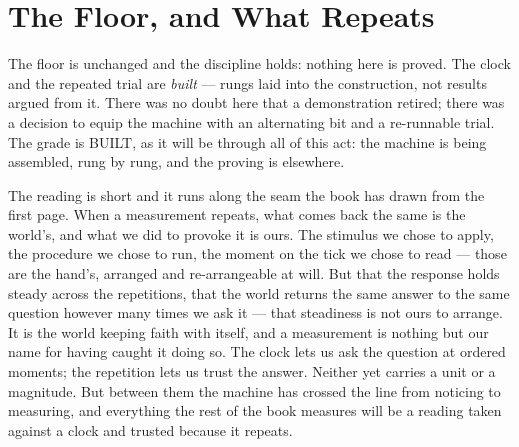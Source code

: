 \section{The Floor, and What Repeats}

The floor is unchanged and the discipline holds: nothing here is proved. The clock and the repeated trial are
\emph{built} --- rungs laid into the construction, not results argued from it. There was no doubt here that a
demonstration retired; there was a decision to equip the machine with an alternating bit and a re-runnable trial.
The grade is BUILT, as it will be through all of this act: the machine is being assembled, rung by rung, and the
proving is elsewhere.

The reading is short and it runs along the seam the book has drawn from the first page. When a measurement
repeats, what comes back the same is the world's, and what we did to provoke it is ours. The stimulus we chose to
apply, the procedure we chose to run, the moment on the tick we chose to read --- those are the hand's, arranged
and re-arrangeable at will. But that the response holds steady across the repetitions, that the world returns the
same answer to the same question however many times we ask it --- that steadiness is not ours to arrange. It is
the world keeping faith with itself, and a measurement is nothing but our name for having caught it doing so. The
clock lets us ask the question at ordered moments; the repetition lets us trust the answer. Neither yet carries a
unit or a magnitude. But between them the machine has crossed the line from noticing to measuring, and everything
the rest of the book measures will be a reading taken against a clock and trusted because it repeats.
